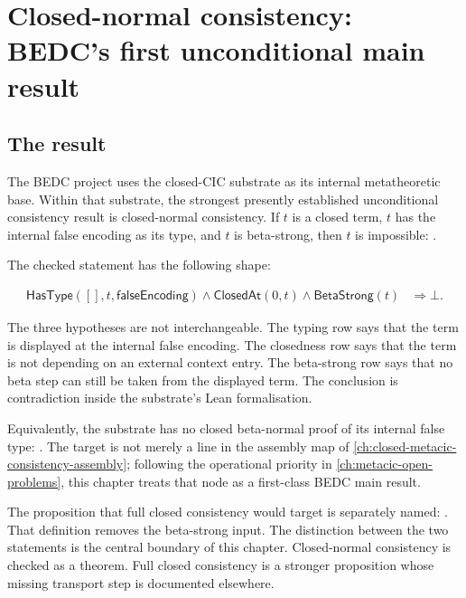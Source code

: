 \chapter{Closed-normal consistency: BEDC's first unconditional main result}
\label{ch:closed-normal-consistency-main-result}

\section{The result}
\label{sec:closed-normal-consistency-main-result-result}

The BEDC project uses the closed-CIC substrate as its internal metatheoretic
base. Within that substrate, the strongest presently established unconditional
consistency result is closed-normal consistency. If $t$ is a closed term, $t$
has the internal false encoding as its type, and $t$ is beta-strong, then $t$
is impossible:
.

The checked statement has the following shape:

$$
\begin{aligned}
  \mathsf{HasType}([],t,\mathsf{falseEncoding})
  \wedge
  \mathsf{ClosedAt}(0,t)
  \wedge
  \mathsf{BetaStrong}(t)
  &\Rightarrow
  \bot.
\end{aligned}
$$

The three hypotheses are not interchangeable. The typing row says that the
term is displayed at the internal false encoding. The closedness row says that
the term is not depending on an external context entry. The beta-strong row
says that no beta step can still be taken from the displayed term. The
conclusion is contradiction inside the substrate's Lean formalisation.

Equivalently, the substrate has no closed beta-normal proof of its internal
false type:
. The target is
not merely a line in the assembly map of
\autoref{ch:closed-metacic-consistency-assembly}; following the operational
priority in \autoref{ch:metacic-open-problems}, this chapter treats that node
as a first-class BEDC main result.

The proposition that full closed consistency would target is separately named:
. That definition removes
the beta-strong input. The distinction between the two statements is the
central boundary of this chapter. Closed-normal consistency is checked as a
theorem. Full closed consistency is a stronger proposition whose missing
transport step is documented elsewhere.

